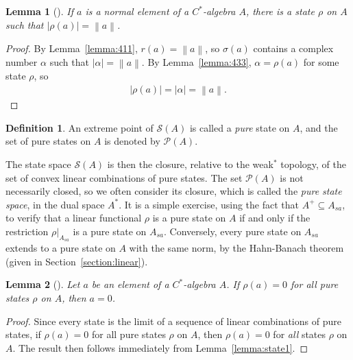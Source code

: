 \documentclass[11pt,a4paper]{report}
\theoremstyle{plain}
\newtheorem{lemma}{Lemma}
\theoremstyle{definition}
\newtheorem*{defn}{Definition}
\newcommand{\1}{\mathbbm{1}}
\renewcommand{\S}{\mathscr{S}}
\renewcommand{\P}[1]{\mathscr{P}(#1)}
\newcommand{\spec}[1]{\sigma(#1)}
\begin{document}
\begin{lemma}[{\cite[4.3.4,(iv)]{kadison83}}]\label{lemma:state2}
	If $a$ is a normal element of a $C^\ast$-algebra $A$, there is a state $\rho$ 
	on $A$ such that $|\rho(a)|=\left\|a\right\|$.
\end{lemma}
\begin{proof}
	By Lemma~\ref{lemma:411}, $r(a)=\left\|a\right\|$, so $\spec a$ contains a 
	complex number $\alpha$ such that $|\alpha|=\left\|a\right\|$. By 
	Lemma~\ref{lemma:433}, $\alpha=\rho(a)$ for some state $\rho$, so 
	\begin{align*}
		|\rho(a)|=|\alpha|=\left\|a\right\|.
	\end{align*}
\end{proof}

\begin{defn}
	An extreme point of $\S(A)$ is called a \emph{pure} state on $A$, and the set 
	of pure states on $A$ is denoted by $\P{A}$.
\end{defn}
The state space $\S(A)$ is then the closure, relative to the weak$^\ast$ 
topology, of the set of convex linear combinations of pure states.
The set $\P A$ is not necessarily closed, so we often consider its closure, 
which is called the \emph{pure state space}, in the dual space $A^\ast$.
It is a simple exercise, using the fact that $A^+\subseteq A_{sa}$, to verify 
that a linear functional $\rho$ is a pure state on $A$ if and only if the 
restriction $\rho|_{A_{sa}}$ is a pure state on $A_{sa}$.
Conversely, every pure state on $A_{sa}$ extends to a pure state on $A$ with the 
same norm, by the Hahn-Banach theorem (given in Section~\ref{section:linear}).
 

\begin{lemma}[{\cite[4.3.8,(i)]{kadison83}}]\label{lemma:pure1}
	Let $a$ be an element of a $C^\ast$-algebra $A$. If $\rho(a)=0$ for all 
	\emph{pure} states $\rho$ on $A$, then $a=0$.
\end{lemma}
\begin{proof}
	Since every state is the limit of a sequence of linear combinations of pure 
	states, if $\rho(a)=0$ for all pure states $\rho$ on $A$, then $\rho(a)=0$ for 
	\emph{all} states $\rho$ on $A$. The result then follows immediately from 
	Lemma~\ref{lemma:state1}.
\end{proof}
\end{document}
